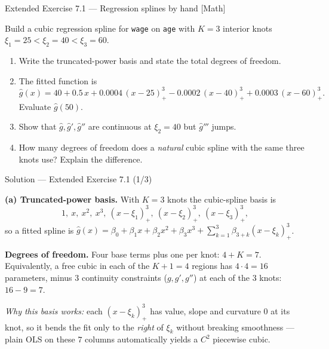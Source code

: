 \documentclass[aspectratio=169,11pt]{beamer}
\begin{document}
\begin{frame}{Extended Exercise 7.1 --- Regression splines by hand [Math]}
\begin{longexercise}
Build a cubic regression spline for \texttt{wage} on \texttt{age} with $K=3$ interior knots $\xi_1=25<\xi_2=40<\xi_3=60$.
\begin{enumerate}
  \item Write the truncated-power basis and state the total degrees of freedom.
  \item The fitted function is
  \[ \hat g(x)=40+0.5\,x+0.0004\,(x-25)^3_+ -0.0002\,(x-40)^3_+ +0.0003\,(x-60)^3_+ . \]
  Evaluate $\hat g(50)$.
  \item Show that $\hat g,\hat g',\hat g''$ are continuous at $\xi_2=40$ but $\hat g'''$ jumps.
  \item How many degrees of freedom does a \emph{natural} cubic spline with the same three knots use? Explain the difference.
\end{enumerate}
\end{longexercise}
\end{frame}

\begin{frame}{Solution --- Extended Exercise 7.1 (1/3)}
\begin{solutionbox}
\textbf{(a) Truncated-power basis.} With $K=3$ knots the cubic-spline basis is
\[ 1,\ x,\ x^2,\ x^3,\ (x-\xi_1)^3_+,\ (x-\xi_2)^3_+,\ (x-\xi_3)^3_+, \]
so a fitted spline is $\hat g(x)=\beta_0+\beta_1x+\beta_2x^2+\beta_3x^3+\sum_{k=1}^{3}\beta_{3+k}(x-\xi_k)^3_+$.

\medskip
\textbf{Degrees of freedom.} Four base terms plus one per knot: $4+K=7$. Equivalently, a free cubic in each of the $K+1=4$ regions has $4\cdot4=16$ parameters, minus $3$ continuity constraints ($g,g',g''$) at each of the $3$ knots: $16-9=7$.

\medskip
\emph{Why this basis works:} each $(x-\xi_k)^3_+$ has value, slope and curvature $0$ at its knot, so it bends the fit only to the \emph{right} of $\xi_k$ without breaking smoothness --- plain OLS on these $7$ columns automatically yields a $C^2$ piecewise cubic.
\end{solutionbox}
\end{frame}
\end{document}
